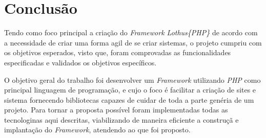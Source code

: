 \chapter{Conclusão\label{cap:conclusao}}
    Tendo como foco principal a criação do \emph{Framework Lothus\{PHP\}} de acordo com a necessidade de criar uma forma agil de se criar sistemas, o projeto cumpriu com os objetivos esperados, visto que, foram comprovadas as funcionalidades especificadas e validados os objetivos específicos.

    O objetivo geral do trabalho foi desenvolver um \emph{Framework} utilizando \emph{PHP} como principal linguagem de programação, e cujo o foco é facilitar a criação de sites e sistema fornecendo bibliotecas capazes de cuidar de toda a parte genéria de um projeto.
    Para tornar a proposta possível foram implementadas todas as tecnologinas aqui descritas, viabilizando de maneira eficiente a construçã e implantação do \emph{Framework}, atendendo ao que foi proposto.
